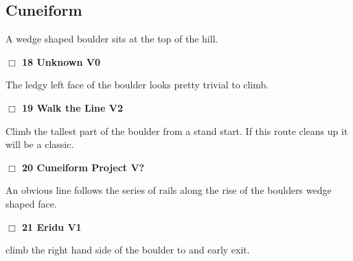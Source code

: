 	\begin{multicols}{2}

\needspace{10em}
\subsection*{Cuneiform}\label{bf:Cuneiform}

A wedge shaped boulder sits at the top of the hill.\\



\needspace{2em}
\label{rt:Cuneiform1}
\colorbox{green!20}{
\parbox{0.95\linewidth}{
\hspace{-1ex}\textbf{$\Box$
18 Unknown V0  
}}}
\begin{adjustwidth}{1.3em}{}			

The ledgy left face of the boulder looks pretty trivial to climb.
\end{adjustwidth}




\needspace{2em}
\label{rt:Walk the Line}
\colorbox{green!20}{
\parbox{0.95\linewidth}{
\hspace{-1ex}\textbf{$\Box$
19 Walk the Line V2  \warn
}}}
\begin{adjustwidth}{1.3em}{}			

Climb the tallest part of the boulder from a stand start. If this route cleans up it will be a classic.
\end{adjustwidth}




\needspace{2em}
\label{rt:Cuneiform Project}
\colorbox{black!20}{
\parbox{0.95\linewidth}{
\hspace{-1ex}\textbf{$\Box$
20 Cuneiform Project V?  
}}}
\begin{adjustwidth}{1.3em}{}			

An obvious line follows the series of rails along the rise of the boulders wedge shaped face.
\end{adjustwidth}




\needspace{2em}
\label{rt:Eridu}
\colorbox{green!20}{
\parbox{0.95\linewidth}{
\hspace{-1ex}\textbf{$\Box$
21 Eridu V1  
}}}
\begin{adjustwidth}{1.3em}{}			

climb the right hand side of the boulder to and early exit.
\end{adjustwidth}






\end{multicols}
\clearpage